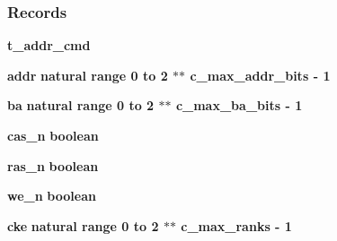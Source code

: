 \subsubsection*{Records}
 \begin{DoxyCompactItemize}
\item 
{\bf t\+\_\+addr\+\_\+cmd} {\bfseries  }
\item 
{\bf addr} {\bfseries {\bfseries \textcolor{comment}{natural}\textcolor{vhdlchar}{ }\textcolor{vhdlchar}{ }\textcolor{vhdlchar}{ }\textcolor{keywordflow}{range}\textcolor{vhdlchar}{ }\textcolor{vhdlchar}{ } \textcolor{vhdldigit}{0} \textcolor{vhdlchar}{ }\textcolor{keywordflow}{to}\textcolor{vhdlchar}{ }\textcolor{vhdlchar}{ } \textcolor{vhdldigit}{2} \textcolor{vhdlchar}{$\ast$}\textcolor{vhdlchar}{$\ast$}\textcolor{vhdlchar}{ }\textcolor{vhdlchar}{ }\textcolor{vhdlchar}{ }{\bfseries {\bf c\+\_\+max\+\_\+addr\+\_\+bits}} \textcolor{vhdlchar}{-\/}\textcolor{vhdlchar}{ } \textcolor{vhdldigit}{1} \textcolor{vhdlchar}{ }}} 
\item 
{\bf ba} {\bfseries {\bfseries \textcolor{comment}{natural}\textcolor{vhdlchar}{ }\textcolor{vhdlchar}{ }\textcolor{vhdlchar}{ }\textcolor{keywordflow}{range}\textcolor{vhdlchar}{ }\textcolor{vhdlchar}{ } \textcolor{vhdldigit}{0} \textcolor{vhdlchar}{ }\textcolor{keywordflow}{to}\textcolor{vhdlchar}{ }\textcolor{vhdlchar}{ } \textcolor{vhdldigit}{2} \textcolor{vhdlchar}{$\ast$}\textcolor{vhdlchar}{$\ast$}\textcolor{vhdlchar}{ }\textcolor{vhdlchar}{ }\textcolor{vhdlchar}{ }{\bfseries {\bf c\+\_\+max\+\_\+ba\+\_\+bits}} \textcolor{vhdlchar}{-\/}\textcolor{vhdlchar}{ } \textcolor{vhdldigit}{1} \textcolor{vhdlchar}{ }}} 
\item 
{\bf cas\+\_\+n} {\bfseries {\bfseries \textcolor{comment}{boolean}\textcolor{vhdlchar}{ }}} 
\item 
{\bf ras\+\_\+n} {\bfseries {\bfseries \textcolor{comment}{boolean}\textcolor{vhdlchar}{ }}} 
\item 
{\bf we\+\_\+n} {\bfseries {\bfseries \textcolor{comment}{boolean}\textcolor{vhdlchar}{ }}} 
\item 
{\bf cke} {\bfseries {\bfseries \textcolor{comment}{natural}\textcolor{vhdlchar}{ }\textcolor{vhdlchar}{ }\textcolor{vhdlchar}{ }\textcolor{keywordflow}{range}\textcolor{vhdlchar}{ }\textcolor{vhdlchar}{ } \textcolor{vhdldigit}{0} \textcolor{vhdlchar}{ }\textcolor{keywordflow}{to}\textcolor{vhdlchar}{ }\textcolor{vhdlchar}{ } \textcolor{vhdldigit}{2} \textcolor{vhdlchar}{$\ast$}\textcolor{vhdlchar}{$\ast$}\textcolor{vhdlchar}{ }\textcolor{vhdlchar}{ }\textcolor{vhdlchar}{ }{\bfseries {\bf c\+\_\+max\+\_\+ranks}} \textcolor{vhdlchar}{-\/}\textcolor{vhdlchar}{ } \textcolor{vhdldigit}{1} \textcolor{vhdlchar}{ }}} 

\end{DoxyCompactItemize}
